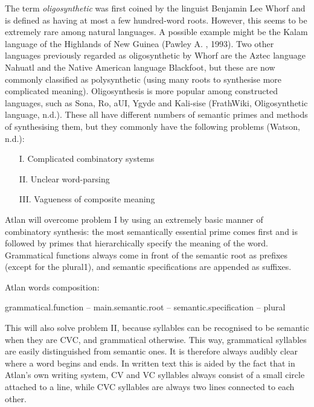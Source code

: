 The term \textit{oligosynthetic} was first coined by the linguist Benjamin Lee Whorf and is defined as having at most a few hundred-word roots. However, this seems to be extremely rare among natural languages. A possible example might be the Kalam language of the Highlands of New Guinea (Pawley A. , 1993). Two other languages previously regarded as oligosynthetic by Whorf are the Aztec language Nahuatl and the Native American language Blackfoot, but these are now commonly classified as polysynthetic (using many roots to synthesise more complicated meaning). Oligosynthesis is more popular among constructed languages, such as Sona, Ro, aUI, Ygyde and Kali-sise (FrathWiki, Oligosynthetic language, n.d.). These all have different numbers of semantic primes and methods of synthesising them, but they commonly have the following problems (Watson, n.d.): 

\begin{itemize}
\item [I.] Complicated combinatory systems  

\item[II.] Unclear word-parsing  

\item[III.]Vagueness of composite meaning 
\end{itemize}

Atlan will overcome problem I by using an extremely basic manner of combinatory synthesis: the most semantically essential prime comes first and is followed by primes that hierarchically specify the meaning of the word. Grammatical functions always come in front of the semantic root as prefixes (except for the plural1), and semantic specifications are appended as suffixes.  

Atlan words composition:  

\begin{center}
{grammatical.function –  main.semantic.root – semantic.specification – plural} 
\end{center}

 

This will also solve problem II, because syllables can be recognised to be semantic when they are CVC, and grammatical otherwise. This way, grammatical syllables are easily distinguished from semantic ones. It is therefore always audibly clear where a word begins and ends. In written text this is aided by the fact that in Atlan’s own writing system, CV and VC syllables always consist of a small circle attached to a line, while CVC syllables are always two lines connected to each other.  

